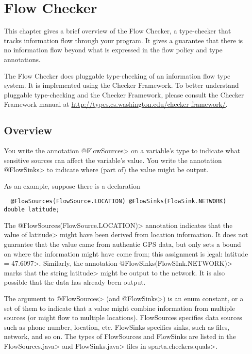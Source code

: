 \htmlhr
\chapter{Flow Checker\label{flow-checker}}

This chapter gives a brief overview of the Flow Checker, a type-checker that 
tracks information flow through your program.  It gives a guarantee that there
is no information flow beyond what is expressed in the flow policy and
type annotations.

The Flow Checker does pluggable type-checking of an information flow type
system.  It is implemented using the Checker Framework.  To better
understand pluggable type-checking and the Checker Framework, please
consult the Checker Framework manual at
\url{http://types.cs.washington.edu/checker-framework/}.  


\section{Overview\label{sec:overview}}

You write the annotation \<@FlowSources> on a variable's
type to indicate what sensitive sources can affect the variable's value.
You write the annotation \<@FlowSinks> to indicate where (part of) the
value might be output.

As an example, suppose there is a declaration
\begin{Verbatim}
  @FlowSources(FlowSource.LOCATION) @FlowSinks(FlowSink.NETWORK) double latitude;
\end{Verbatim}
\noindent
The \<@FlowSources(FlowSource.LOCATION)> annotation indicates that the
value of \<latitude> might have been derived from
location information.  It does not guarantee that the value came from
authentic GPS data, but only sets a bound on where the information might
have come from; this assignment is legal: \<latitude = 47.6097>.
Similarly, the annotation \<@FlowSinks(FlowSInk.NETWORK)> marks that
the string \<latitude> might be output to the network.  It is also
possible that the data has already been output.

The argument to \<@FlowSources> (and \<@FlowSinks>) is an enum constant, or a
set of them to indicate that a value might combine information from
multiple sources (or might flow to multiple locations).
FlowSources specifies data sources such as phone number, location, 
etc.  FlowSinks specifies sinks, such as files, network, and so on.
The types of FlowSources and FlowSinks are listed in the
\<FlowSources.java> and \<FlowSinks.java> files in \<sparta.checkers.quals>.






